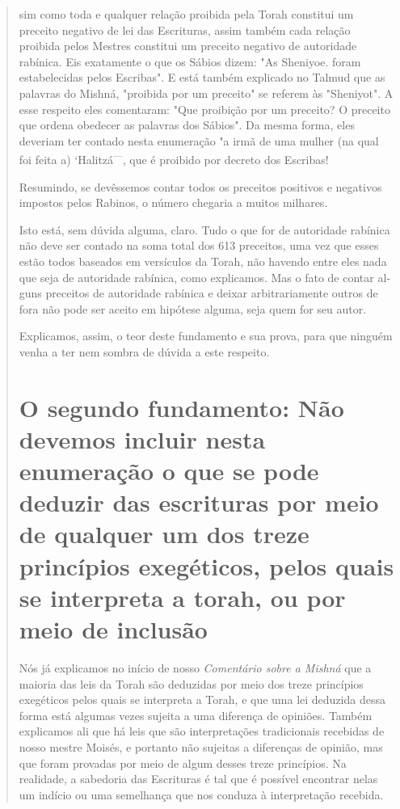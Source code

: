 \begin{quote}
sim como toda e qualquer relação proibida pela Torah constitui um
preceito negativo de lei das Escrituras, assim também cada relação
proibida pelos Mes­tres constitui um preceito negativo de autoridade
rabínica. Eis exatamente o que os Sábios dizem: "As
Sheniyoe. foram estabelecidas pelos Escribas". E es­tá
também explicado no Talmud que as palavras do Mishná, "proibida por um
preceito" se referem às "Sheniyot". A esse respeito eles comentaram:
"Que proi­bição por um preceito? O preceito que ordena obedecer as
palavras dos Sá­bios". Da mesma forma, eles deveriam ter contado nesta
enumeração "a irmã de uma mulher (na qual foi feita a)
`Halitzá\textsuperscript{---}, que é proibido por decreto dos Escribas!

Resumindo, se devêssemos contar todos os preceitos positivos e
ne­gativos impostos pelos Rabinos, o número chegaria a muitos milhares.

Isto está, sem dúvida alguma, claro. Tudo o que for de autoridade
rabínica não deve ser contado na soma total dos 613 preceitos, uma vez
que esses estão todos baseados em versículos da Torah, não havendo entre
eles na­da que seja de autoridade rabínica, como explicamos. Mas o fato
de contar al­guns preceitos de autoridade rabínica e deixar
arbitrariamente outros de fora não pode ser aceito em hipótese alguma,
seja quem for seu autor.

Explicamos, assim, o teor deste fundamento e sua prova, para que ninguém
venha a ter nem sombra de dúvida a este respeito.

\chapter{O segundo fundamento:
Não devemos incluir nesta enumeração o que se pode deduzir das
escrituras por meio de qualquer um dos treze princípios exegéticos,
pelos quais se interpreta a torah,
ou por meio de inclusão}

Nós já explicamos no início de nosso \emph{Comentário sobre a Mishná}
que a maioria das leis da Torah são deduzidas por meio dos treze
princípios exegéticos pelos quais se interpreta a Torah, e que uma lei
deduzida dessa for­ma está algumas vezes sujeita a uma diferença de
opiniões. Também explica­mos ali que há leis que são interpretações
tradicionais recebidas de nosso mes­tre Moisés, e portanto não sujeitas
a diferenças de opinião, mas que foram pro­vadas por meio de algum
desses treze princípios. Na realidade, a sabedoria das Escrituras é tal
que é possível encontrar nelas um indício ou uma semelhança que nos
conduza à interpretação recebida.


\end{quote}
